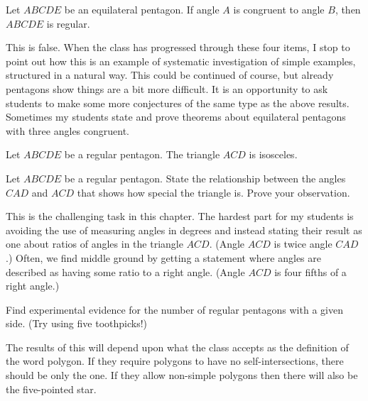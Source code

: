 \begin{conjecture}\label{conj:equilateral-pentagon}
Let $ABCDE$ be an equilateral pentagon. If angle $A$ is congruent to angle $B$, then $ABCDE$ is regular.
\end{conjecture}

\begin{annotation}
{
\color{blue}
This is false. When the class has progressed through these four items, I stop to point out how this is an example of 
systematic investigation of simple examples, structured in a natural way. This could be continued of course, but already pentagons show things are a bit more difficult. It is an opportunity to ask students to make some more conjectures of the same type as the above results. Sometimes my students state and prove theorems about equilateral pentagons with three angles congruent. 
}
\end{annotation}


\begin{conjecture}\label{conj:regular-pentagon-central-triangle}
Let $ABCDE$ be a regular pentagon. The triangle $ACD$ is isosceles.
\end{conjecture}

\begin{problem}\label{prob:reg-pentagon-angles}
Let $ABCDE$ be a regular pentagon. State the relationship between the angles $CAD$ and $ACD$ that shows how special the triangle is. Prove your observation.
\end{problem}

\begin{annotation}
{
\color{blue}
This is the challenging task in this chapter. The hardest part for my students is avoiding the use of measuring angles in degrees and instead stating their result as one about ratios of angles in the triangle $ACD$. (Angle $ACD$ is twice angle $CAD$.) Often, we find middle ground by getting a statement where angles are described as having some ratio to a right angle. (Angle $ACD$ is four fifths of a right angle.)
}
\end{annotation}

\begin{problem}\label{prob:reg-pentagon-types}
Find experimental evidence for the number of regular pentagons with a given side. (Try using five toothpicks!)
\end{problem}

\begin{annotation}
{
\color{blue}
The results of this will depend upon what the class accepts as the definition of the word polygon. If they require polygons to have no self-intersections, there should be only the one. If they allow non-simple polygons then there will also be the five-pointed star.
}
\end{annotation}


